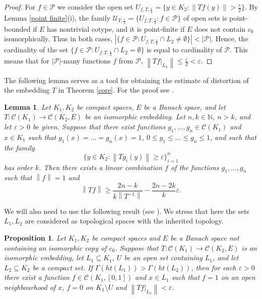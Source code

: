 \documentclass{amsart}
\numberwithin{equation}{section}
\newtheorem{lemma}[thm]{Lemma}
\newtheorem{prop}[thm]{Proposition}
\theoremstyle{definition}
\def\C{\mathcal C}
\def\ep{\varepsilon}
\def\en{\mathbb N}
\newcommand{\norm}[1]{\left\|#1\right\|}
\newcommand{\abs}[1]{\left| #1  \right|}
\begin{document}
\begin{proof}
For $f \in \mathcal{P}$ we consider the open set $U_{f, T, \frac{\ep}{2}}=\{y \in K_2: \norm{Tf(y)} > \frac{\ep}{2}\}$. By Lemma \ref{point finite}(i), the family $\mathcal{U}_{T, \frac{\ep}{2}}=\{ U_{f, T, \frac{\ep}{2}}:f \in \mathcal{P}\}$ of open sets is point-bounded if $E$ has nontrivial cotype, and it is point-finite if $E$ does not contain $c_0$ isomorphically. Thus in both cases, $\abs{\{f \in \mathcal{P}:U_{f, T, \frac{\ep}{2}} \cap L_2 \neq \emptyset \}} < \abs{\mathcal{P}}$. Hence, the cardinality of the set $\{f \in \mathcal{P}:U_{f, T, \frac{\ep}{2}} \cap L_2 = \emptyset \}$ is equal to cardinality of $\mathcal{P}$. This means that for $\abs{\mathcal{P}}$-many functions $f$ from $\mathcal{P}$, $\norm{Tf|_{L_2}} \leq \frac{\ep}{2}<\ep$.
\end{proof}

The following lemma serves as a tool for obtaining the estimate of distortion of the embedding $T$ in Theorem \ref{core}. For the proof see \cite[Lemma 2.2(b)]{rondos-somaglia}. 
\begin{lemma}
\label{norm}
Let $K_1, K_2$ be compact spaces, $E$ be a Banach space, and let $T:\C(K_1) \rightarrow \C(K_2, E)$ be an isomorphic embedding. Let $n, k \in \en$, $n>k$, and let $\ep>0$ be given. Suppose that there exist functions $g_1, \ldots, g_n \in \C(K_1)$ and $x \in K_1$ such  that $g_1(x)=\ldots =g_n(x)=1$, $0 \leq g_1 \leq \ldots \leq g_n \leq 1$, and such that the family
\[\{ y \in K_2: \norm{Tg_i(y)} \geq \ep \}_{i=1}^n\]
has order $k$. Then there exists a linear combination $f$ of the functions $g_1, \ldots, g_n$ such that $\norm{f}=1$ and
\[\norm{Tf} \geq \frac{2n-k}{k\norm{T^{-1}}}-\frac{2n-2k}{k}\ep.\]
\end{lemma}

We will also need to use the following result (see \cite[Proposition 2.4(a)]{rondos-somaglia}). We stress that here the sets $L_1, L_2$ are considered as topological spaces with the inherited topology.

\begin{prop}
\label{pom}
Let $K_1, K_2$ be compact spaces and $E$ be a Banach space not containing an isomorphic copy of $c_0$. Suppose that $T:\C(K_1) \rightarrow \C(K_2, E)$ is an isomorphic embedding, let $L_1 \subseteq K_1$, $U$ be an open set containing $L_1$, and let $L_2 \subseteq K_2$ be a compact set. If $\Gamma(ht(L_1))>\Gamma(ht(L_2))$, then for each $\ep>0$ there exist a function $f \in \C(K_1, [0, 1])$ and $x \in L_1$ such that $f=1$ on an open neighbourhood of $x$, $f=0$ on $K_1 \setminus U$ and $\norm{Tf|_{L_2}}<\ep$.
\end{prop}
\end{document}
